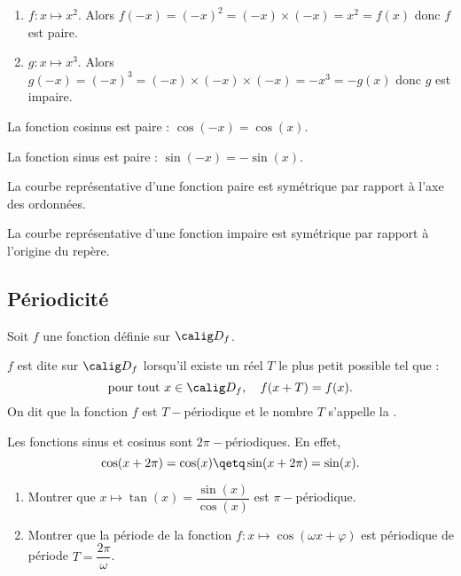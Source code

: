 \documentclass[10pt,openright,twoside,french]{book}
\begin{document}
\begin{Exemple}[s]
    \begin{enumerate}
        \item $f \colon x \mapsto x^2$. Alors $f(-x) = (-x)^2 = (-x) \times (-x) = x^2 = f(x)$ donc $f$ est paire.
        \item $g \colon x \mapsto x^3$. Alors $g(-x) = (-x)^3 = (-x) \times (-x) \times (-x) = -x^3 = -g(x)$ donc $g$ est impaire.
    \end{enumerate}
\end{Exemple}

\begin{Prop}
    La fonction cosinus est paire : $\cos(-x) = \cos(x)$.\par
    La fonction sinus est paire : $\sin(-x) = -\sin(x)$.
\end{Prop}

\begin{Prop}
    La courbe représentative d'une fonction paire est symétrique par rapport à l'axe des ordonnées.\par
    La courbe représentative d'une fonction impaire est symétrique par rapport à l'origine du repère.
\end{Prop}

\subsection{Périodicité}

\begin{Defi}
    Soit $f$ une fonction définie sur $\calig D_f$.\par
    $f$ est dite  sur $\calig D_f$ lorsqu'il existe un réel $T$ le plus petit possible tel que :
    \[\text{pour tout } x \in \calig D_f,\quad f(x + T) = f(x).\]
    On dit que la fonction $f$ est $T-$périodique et le nombre $T$ s'appelle la .
\end{Defi}

\begin{Prop}
    Les fonctions sinus et cosinus sont $2\pi-$périodiques. En effet,
    \[\cos(x + 2\pi) = \cos(x) \qetq \sin(x + 2\pi) = \sin(x).\]
\end{Prop}

\begin{Exemple}[s]
    \begin{enumerate}
        \item Montrer que $x \mapsto \tan(x) = \dfrac{\sin(x)}{\cos(x)}$ est $\pi-$périodique.
        \item Montrer que la période de la fonction $f \colon x \mapsto \cos(\omega x + \varphi)$ est périodique de période $T = \dfrac{2\pi}{\omega}$.
    \end{enumerate}
\end{Exemple}
\end{document}
